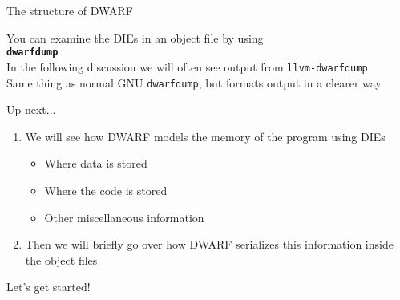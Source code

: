 \begin{frame}{The structure of DWARF}
\begin{center}
You can examine the DIEs in an object file by using\\
\texttt{\textbf{dwarfdump}}\\
\bigskip
In the following discussion we will often see output from \texttt{llvm-dwarfdump}\\
\medskip
{\footnotesize Same thing as normal GNU \texttt{dwarfdump}, but formats output in a clearer way}\\
\end{center}
\end{frame}


\begin{frame}{Up next...}
\begin{enumerate}
\item We will see \alert{how DWARF models the memory of the program} using DIEs
	\begin{itemize}
	\item Where data is stored
	\item Where the code is stored
	\item Other miscellaneous information
	\end{itemize}
\item Then we will briefly go over how \alert{DWARF serializes this information inside the object files}
\end{enumerate}
\bigskip
\centering Let's get started!\\

\end{frame}


